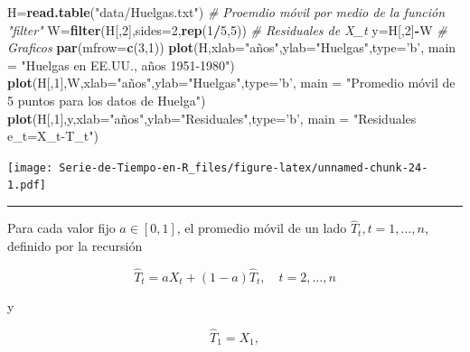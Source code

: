 \documentclass[12pt,]{krantz}
\makeatletter
\newenvironment{Shaded}{\begin{snugshade}}{\end{snugshade}}
\newcommand{\KeywordTok}[1]{\textcolor[rgb]{0.13,0.29,0.53}{\textbf{#1}}}
\newcommand{\DataTypeTok}[1]{\textcolor[rgb]{0.13,0.29,0.53}{#1}}
\newcommand{\DecValTok}[1]{\textcolor[rgb]{0.00,0.00,0.81}{#1}}
\newcommand{\StringTok}[1]{\textcolor[rgb]{0.31,0.60,0.02}{#1}}
\newcommand{\CommentTok}[1]{\textcolor[rgb]{0.56,0.35,0.01}{\textit{#1}}}
\newcommand{\OperatorTok}[1]{\textcolor[rgb]{0.81,0.36,0.00}{\textbf{#1}}}
\newcommand{\NormalTok}[1]{#1}
\newenvironment{kframe}{%
\medskip{}
\setlength{\fboxsep}{.8em}
 \def\at@end@of@kframe{}%
 \ifinner\ifhmode%
  \def\at@end@of@kframe{\end{minipage}}%
  \begin{minipage}{\columnwidth}%
 \fi\fi%
 \def\FrameCommand##1{\hskip\@totalleftmargin \hskip-\fboxsep
 \colorbox{shadecolor}{##1}\hskip-\fboxsep
     \hskip-\linewidth \hskip-\@totalleftmargin \hskip\columnwidth}%
 \MakeFramed {\advance\hsize-\width
   \@totalleftmargin\z@ \linewidth\hsize
   \@setminipage}}%
 {\par\unskip\endMakeFramed%
 \at@end@of@kframe}
\renewenvironment{Shaded}{\begin{kframe}}{\end{kframe}}
\theoremstyle{definition}
\theoremstyle{definition}
\theoremstyle{definition}
\theoremstyle{remark}
\makeatother
\begin{document}
\begin{Shaded}
\begin{Highlighting}[]
\NormalTok{H=}\KeywordTok{read.table}\NormalTok{(}\StringTok{"data/Huelgas.txt"}\NormalTok{)}
\CommentTok{# Proemdio móvil por medio de la función "filter"}
\NormalTok{W=}\KeywordTok{filter}\NormalTok{(H[,}\DecValTok{2}\NormalTok{],}\DataTypeTok{sides=}\DecValTok{2}\NormalTok{,}\KeywordTok{rep}\NormalTok{(}\DecValTok{1}\OperatorTok{/}\DecValTok{5}\NormalTok{,}\DecValTok{5}\NormalTok{))}
\CommentTok{# Residuales de X_t}
\NormalTok{y=H[,}\DecValTok{2}\NormalTok{]}\OperatorTok{-}\NormalTok{W }
\CommentTok{# Graficos}
\KeywordTok{par}\NormalTok{(}\DataTypeTok{mfrow=}\KeywordTok{c}\NormalTok{(}\DecValTok{3}\NormalTok{,}\DecValTok{1}\NormalTok{))}
\KeywordTok{plot}\NormalTok{(H,}\DataTypeTok{xlab=}\StringTok{"años"}\NormalTok{,}\DataTypeTok{ylab=}\StringTok{"Huelgas"}\NormalTok{,}\DataTypeTok{type=}\StringTok{'b'}\NormalTok{,}
     \DataTypeTok{main =} \StringTok{"Huelgas en EE.UU., años 1951-1980"}\NormalTok{)}
\KeywordTok{plot}\NormalTok{(H[,}\DecValTok{1}\NormalTok{],W,}\DataTypeTok{xlab=}\StringTok{"años"}\NormalTok{,}\DataTypeTok{ylab=}\StringTok{"Huelgas"}\NormalTok{,}\DataTypeTok{type=}\StringTok{'b'}\NormalTok{,}
     \DataTypeTok{main =} \StringTok{"Promedio móvil de 5 puntos para los datos de Huelga"}\NormalTok{)}
\KeywordTok{plot}\NormalTok{(H[,}\DecValTok{1}\NormalTok{],y,}\DataTypeTok{xlab=}\StringTok{"años"}\NormalTok{,}\DataTypeTok{ylab=}\StringTok{"Residuales"}\NormalTok{,}\DataTypeTok{type=}\StringTok{'b'}\NormalTok{,}
     \DataTypeTok{main =} \StringTok{"Residuales e_t=X_t-T_t"}\NormalTok{)}
\end{Highlighting}
\end{Shaded}

\texttt{[image: Serie-de-Tiempo-en-R\_files/figure-latex/unnamed-chunk-24-1.pdf]}

\begin{center}\rule{0.5\linewidth}{\linethickness}\end{center}

Para cada valor fijo \(a\in[0,1]\), el promedio móvil de un lado
\(\hat{T}_t, t=1,\ldots,n\), definido por la recursión

\begin{equation}
  \hat{T}_t = aX_t+(1-a)\hat{T}_t,\quad t=2,\ldots,n
 \label{eq:eq-promedio-movil-1-lado-peso}
\end{equation}

y

\[\hat{T}_1=X_1,\]
\end{document}
